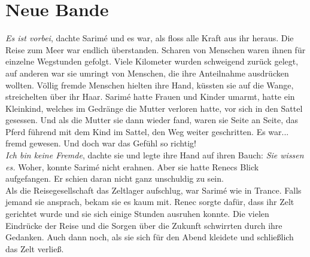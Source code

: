 
\chapter{Neue Bande}

\textit{Es ist vorbei}, dachte Sarimé und es war, als floss alle Kraft aus ihr heraus. Die Reise 
zum Meer war endlich überstanden. Scharen von Menschen waren ihnen für einzelne Wegstunden gefolgt. 
Viele Kilometer wurden schweigend zurück gelegt, auf anderen war sie umringt von Menschen, die ihre 
Anteilnahme ausdrücken wollten. Völlig fremde Menschen hielten ihre Hand, küssten sie auf die 
Wange, streichelten über ihr Haar. Sarimé hatte Frauen und Kinder umarmt, hatte ein Kleinkind, 
welches im Gedränge die Mutter verloren hatte, vor sich in den Sattel gesessen. Und als die Mutter 
sie dann wieder fand, waren sie Seite an Seite, das Pferd führend mit dem Kind im Sattel, den Weg 
weiter geschritten. Es war... fremd gewesen. Und doch war das Gefühl so richtig!\\
\textit{Ich bin keine Fremde}, dachte sie und legte ihre Hand auf ihren Bauch: \textit{Sie wissen 
es.} Woher, konnte Sarimé nicht erahnen. Aber sie hatte Renecs Blick aufgefangen. Er schien daran 
nicht ganz unschuldig zu sein. \\
Als die Reisegesellschaft das Zeltlager aufschlug, war Sarimé wie in Trance. Falls jemand sie 
ansprach, bekam sie es kaum mit. Renec sorgte dafür, dass ihr Zelt gerichtet wurde und sie sich 
einige Stunden ausruhen konnte. Die vielen Eindrücke der Reise und die Sorgen über die Zukunft 
schwirrten durch ihre Gedanken. Auch dann noch, als sie sich für den Abend kleidete und schließlich 
das Zelt verließ.\\

